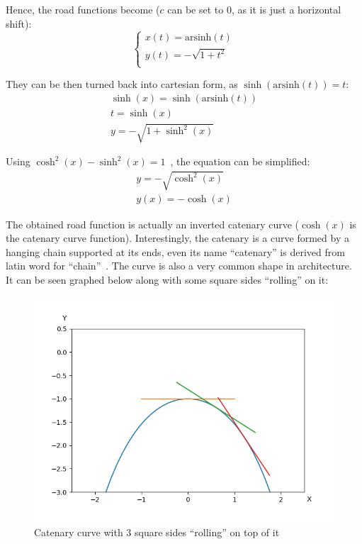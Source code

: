 \documentclass[12pt]{article}
\begin{document}
        Hence, the road functions become ($c$ can be set to 0, as it is just a horizontal shift):
        \begin{equation}\label{eq:road_2}
            \begin{cases}
                x(t) = \text{arsinh}(t) \\
                y(t) = -\sqrt{1+t^2} \\
            \end{cases}
        \end{equation}

        They can be then turned back into cartesian form, as $\sinh(\text{arsinh}(t)) = t$:
        \begin{align}
            \sinh(x) = \sinh(\text{arsinh}(t)) \\
            t = \sinh(x) \\
            y = -\sqrt{1+\sinh^2(x)}
        \end{align}

        Using $\cosh^2(x) - \sinh^2(x) = 1$~\cite{oxford_dict}, the equation can be simplified:
        \begin{align}
            y = -\sqrt{\cosh^2(x)} \\
            y(x) = -\cosh(x)
        \end{align}

        The obtained road function is actually an inverted catenary curve ($\cosh(x)$ is the catenary curve function). Interestingly, the catenary is a curve formed by a hanging chain supported at its ends, even its name ``catenary'' is derived from latin word for ``chain''~\cite{mathworld_catenary}. The curve is also a very common shape in architecture. It can be seen graphed below along with some square sides ``rolling'' on it:
        
        \begin{figure}[H]
            \centering
            \includegraphics[width=0.75\linewidth]{images/cosh_many.png}
            \caption[Catenary curve with 3 square sides]{Catenary curve with 3 square sides ``rolling'' on top of it\footnotemark}\label{fig:cosh}
        \end{figure}
\end{document}
